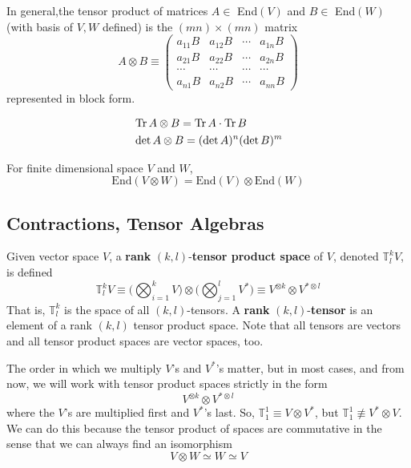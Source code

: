   \begin{theorem}
    In general,the tensor product of matrices $A \in $ End$(V)$ and $B \in $ End$(W)$ (with basis of $V, W$ defined) is the $(m n) \times (m n)$ matrix
    \[A \otimes B \equiv \begin{pmatrix}
    a_{11} B & a_{12} B & \cdots & a_{1n} B \\
    a_{21} B & a_{22} B & \cdots & a_{2n} B \\
    \cdots & \cdots & \cdots & \cdots \\
    a_{n1} B & a_{n2} B & \cdots & a_{nn} B 
    \end{pmatrix}\]
    represented in block form. 
  \end{theorem}

  \begin{theorem}
    \begin{align*}
        & \operatorname{Tr}{A \otimes B} = \operatorname{Tr}{A} \cdot \operatorname{Tr}{B} \\
        & \det{A \otimes B} = (\det{A})^n (\det{B})^m
    \end{align*}
  \end{theorem}

  \begin{theorem}
    For finite dimensional space $V$ and $W$, 
    \[\text{End}(V \otimes W) = \text{End}(V) \otimes \text{End}(W)\]
  \end{theorem}

\subsection{Contractions, Tensor Algebras}

  \begin{definition}
    Given vector space $V$, a \textbf{rank }$(k, l)$-\textbf{tensor product space} of $V$, denoted $\mathbb{T}^{k}_{l} V$, is defined
    \[ \mathbb{T}^k_l V \equiv \bigg( \bigotimes_{i=1}^{k} V \bigg) \otimes \bigg( \bigotimes_{j=1}^{l} V^{*} \bigg) \equiv V^{\otimes k} \otimes V^{* \otimes l}\]
    That is, $\mathbb{T}^{k}_{l}$ is the space of all $(k, l)$-tensors. A \textbf{rank }$(k, l)$-\textbf{tensor} is an element of a rank $(k, l)$ tensor product space. Note that all tensors are vectors and all tensor product spaces are vector spaces, too. 

    The order in which we multiply $V$'s and $V^*$'s matter, but in most cases, and from now, we will work with tensor product spaces strictly in the form 
    \[ V^{\otimes k} \otimes V^{* \otimes l} \]
    where the $V$'s are multiplied first and $V^*$'s last. So, $\mathbb{T}^{1}_{1} \equiv V \otimes V^*$, but $\mathbb{T}^{1}_{1} \not\equiv V^* \otimes V$. We can do this because the tensor product of spaces are commutative in the sense that we can always find an isomorphism
    \[V \otimes W \simeq W \simeq V\]
  \end{definition}

